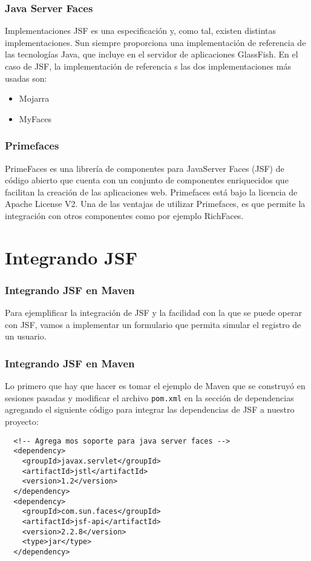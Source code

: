 \documentclass{beamer}
\begin{document}
\begin{frame}[fragile]
  \frametitle{Java Server Faces}

  \begin{block}{Implementaciones}
    JSF es una especificación y, como tal, existen distintas
    implementaciones. Sun siempre proporciona una implementación de
    referencia de las tecnologías Java, que incluye en el servidor de
    aplicaciones GlassFish. En el caso de JSF, la implementación de
    referencia \emph{}s las dos implementaciones más usadas son:

    \begin{itemize}
    \item Mojarra
    \item MyFaces
    \end{itemize}
  \end{block}

\end{frame}

\begin{frame}
  \frametitle{Primefaces}

   PrimeFaces es una librería de componentes para JavaServer Faces
   (JSF) de código abierto que cuenta con un conjunto de componentes
   enriquecidos que facilitan la creación de las aplicaciones
   web. Primefaces está bajo la licencia de Apache License V2. Una de las
   ventajas de utilizar Primefaces, es que permite la integración con
   otros componentes como por ejemplo RichFaces.
\end{frame}

\section{Integrando JSF}

\begin{frame}
  \frametitle{Integrando JSF en Maven}
  Para ejemplificar la integración de JSF y la facilidad con la que se
  puede operar con JSF, vamos a implementar un formulario que permita
  simular el registro de un usuario.
\end{frame}


\begin{frame}[fragile]
  \frametitle{Integrando JSF en Maven}
  Lo primero que hay que hacer es tomar el ejemplo de Maven que se
  construyó en sesiones pasadas y modificar el archivo \texttt{pom.xml}
  en la sección de dependencias agregando el siguiente código para
  integrar las dependencias de JSF a nuestro proyecto:

  \begin{verbatim}
  <!-- Agrega mos soporte para java server faces -->
  <dependency>
    <groupId>javax.servlet</groupId>
    <artifactId>jstl</artifactId>
    <version>1.2</version>
  </dependency>
  <dependency>
    <groupId>com.sun.faces</groupId>
    <artifactId>jsf-api</artifactId>
    <version>2.2.8</version>
    <type>jar</type>
  </dependency>
  \end{verbatim}
\end{frame}
\end{document}
